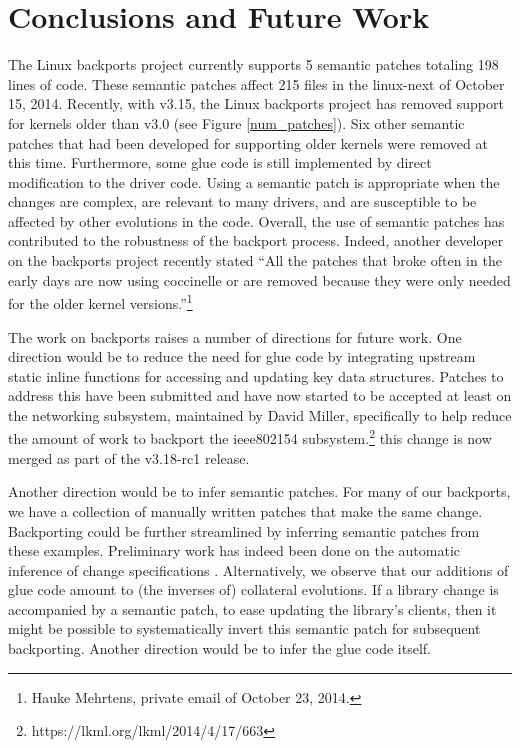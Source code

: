 \section{Conclusions and Future Work}
\label{concl}

The Linux backports project currently supports 5 semantic patches totaling
198 lines of code.  These semantic patches affect 215 files in the
linux-next of October 15, 2014.  Recently, with v3.15, the Linux backports
project has removed support for kernels older than v3.0 (see Figure
\ref{num_patches}).  Six other semantic patches that had been developed for
supporting older kernels were removed at this time.  Furthermore, some glue
code is still implemented by direct modification to the driver code.  Using
a semantic patch is appropriate when the changes are complex, are relevant
to many drivers, and are susceptible to be affected by other evolutions in
the code.  Overall, the use of semantic patches has contributed to the
robustness of the backport process.  Indeed, another developer on the
backports project recently stated ``All the patches that broke often in the
early days are now using coccinelle or are removed because they were only
needed for the older kernel versions.''\footnote{Hauke Mehrtens, private
  email of October 23, 2014.}

The work on backports raises a number of directions for future work.  One
direction would be to reduce the need for glue code by integrating upstream
static inline functions for accessing and updating key data structures.
Patches to address this have been submitted and have now started to be
accepted at least on the networking subsystem, maintained by David Miller,
specifically to help reduce the amount of work to backport the ieee802154
subsystem.\footnote{https://lkml.org/lkml/2014/4/17/663} this change is now
merged as part of the v3.18-rc1 release.

Another direction would be to infer semantic patches.  For many of our
backports, we have a collection of manually written patches that make the
same change.  Backporting could be further streamlined by inferring
semantic patches from these examples.  Preliminary work has indeed been
done on the automatic inference of change specifications
\cite{jAndersenAse2008,Meng:13}.  Alternatively, we observe that our
additions of glue code amount to (the inverses of) collateral evolutions.
If a library change is accompanied by a semantic patch, to ease updating
the library's clients, then it might be possible to systematically invert
this semantic patch for subsequent backporting.  Another direction would be
to infer the glue code itself.

